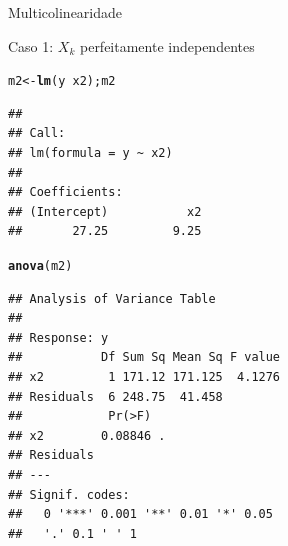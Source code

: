 \documentclass{beamer}\usepackage[]{graphicx}\usepackage[]{color}
\makeatletter
\newcommand{\hlopt}[1]{\textcolor[rgb]{0,0,0}{#1}}%
\newcommand{\hlstd}[1]{\textcolor[rgb]{0.345,0.345,0.345}{#1}}%
\newcommand{\hlkwb}[1]{\textcolor[rgb]{0.69,0.353,0.396}{#1}}%
\newcommand{\hlkwd}[1]{\textcolor[rgb]{0.737,0.353,0.396}{\textbf{#1}}}%
\newenvironment{kframe}{%
 \def\at@end@of@kframe{}%
 \ifinner\ifhmode%
  \def\at@end@of@kframe{\end{minipage}}%
  \begin{minipage}{\columnwidth}%
 \fi\fi%
 \def\FrameCommand##1{\hskip\@totalleftmargin \hskip-\fboxsep
 \colorbox{shadecolor}{##1}\hskip-\fboxsep
     \hskip-\linewidth \hskip-\@totalleftmargin \hskip\columnwidth}%
 \MakeFramed {\advance\hsize-\width
   \@totalleftmargin\z@ \linewidth\hsize
   \@setminipage}}%
 {\par\unskip\endMakeFramed%
 \at@end@of@kframe}
\newenvironment{knitrout}{}{} %
\renewenvironment{knitrout}{\setlength{\topsep}{0mm}}{}
\makeatother
\begin{document}
\begin{frame}[fragile]{Multicolinearidade}

Caso 1: $X_k$ perfeitamente independentes
\vfill

\begin{knitrout}\tiny
{}\color{fgcolor}\begin{kframe}
\begin{alltt}
\hlstd{m2} \hlkwb{<-} \hlkwd{lm}\hlstd{(y} \hlopt{~} \hlstd{x2); m2}
\end{alltt}
\begin{verbatim}
## 
## Call:
## lm(formula = y ~ x2)
## 
## Coefficients:
## (Intercept)           x2  
##       27.25         9.25
\end{verbatim}
\begin{alltt}
\hlkwd{anova}\hlstd{(m2)}
\end{alltt}
\begin{verbatim}
## Analysis of Variance Table
## 
## Response: y
##           Df Sum Sq Mean Sq F value
## x2         1 171.12 171.125  4.1276
## Residuals  6 248.75  41.458        
##            Pr(>F)  
## x2        0.08846 .
## Residuals          
## ---
## Signif. codes:  
##   0 '***' 0.001 '**' 0.01 '*' 0.05
##   '.' 0.1 ' ' 1
\end{verbatim}
\end{kframe}
\end{knitrout}

\end{frame}
\end{document}
